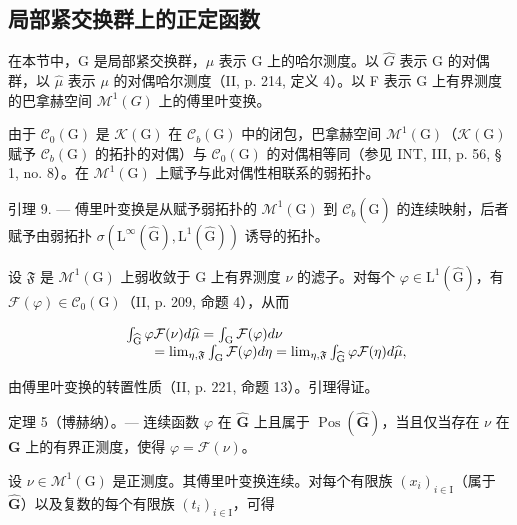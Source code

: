 \subsection{局部紧交换群上的正定函数}

在本节中，G 是局部紧交换群，\(\mu\) 表示 G 上的哈尔测度。以 \(\widehat{G}\) 表示 G 的对偶群，以 \(\widehat{\mu}\) 表示 \(\mu\) 的对偶哈尔测度（II, p. 214, 定义 4）。以 F 表示 G 上有界测度的巴拿赫空间 \(\mathcal{M}^{1}(G)\) 上的傅里叶变换。

由于 \(\mathcal{C}_0(\mathrm{G})\) 是 \(\mathcal{K}(\mathrm{G})\) 在 \(\mathcal{C}_b(\mathrm{G})\) 中的闭包，巴拿赫空间 \(\mathcal{M}^1 (\mathrm{G})\)（\(\mathcal{K}(\mathrm{G})\) 赋予 \(\mathcal{C}_b(\mathrm{G})\) 的拓扑的对偶）与 \(\mathcal{C}_0(\mathrm{G})\) 的对偶相等同（参见 INT, III, p. 56, § 1, no. 8）。在 \(\mathcal{M}^1 (\mathrm{G})\) 上赋予与此对偶性相联系的弱拓扑。

引理 9. --- 傅里叶变换是从赋予弱拓扑的 \(\mathcal{M}^{1}(\mathrm{G})\) 到 \(\mathcal{C}_{b}(\widehat{\mathrm{G}})\) 的连续映射，后者赋予由弱拓扑 \(\sigma(\mathrm{L}^{\infty}(\widehat{\mathrm{G}}),\mathrm{L}^{1}(\widehat{\mathrm{G}}))\) 诱导的拓扑。

设 \(\mathfrak{F}\) 是 \(\mathcal{M}^1 (\mathrm{G})\) 上弱收敛于 G 上有界测度 \(\nu\) 的滤子。对每个 \(\varphi \in \mathrm{L}^1 (\widehat{\mathrm{G}})\)，有 \(\mathcal{F}(\varphi)\in \mathcal{C}_0(\mathrm{G})\)（II, p. 209, 命题 4），从而

\[
\begin{array}{r l} & {\int_ {\widehat {\mathrm{G}}} \varphi \mathcal {F} (\nu) d \widehat {\mu} = \int_ {\mathrm{G}} \mathcal {F} (\varphi) d \nu} \\ & {\qquad = \lim _ {\eta , \mathfrak {F}} \int_ {\mathrm{G}} \mathcal {F} (\varphi) d \eta = \lim _ {\eta , \mathfrak {F}} \int_ {\widehat {\mathrm{G}}} \varphi \mathcal {F} (\eta) d \widehat {\mu},} \end{array}
\]

由傅里叶变换的转置性质（II, p. 221, 命题 13）。引理得证。

定理 5（博赫纳）。--- 连续函数 \(\varphi\) 在 \(\widehat{\mathbf{G}}\) 上且属于 \(\operatorname{Pos}(\widehat{\mathbf{G}})\)，当且仅当存在 \(\nu\) 在 \(\mathbf{G}\) 上的有界正测度，使得 \(\varphi = \mathcal{F}(\nu)\)。

设 \(\nu \in \mathcal{M}^{1}(\mathrm{G})\) 是正测度。其傅里叶变换连续。对每个有限族 \((x_{i})_{i\in \mathrm{I}}\)（属于 \(\widehat{\mathbf{G}}\)）以及复数的每个有限族 \((t_i)_{i\in \mathrm{I}}\)，可得

